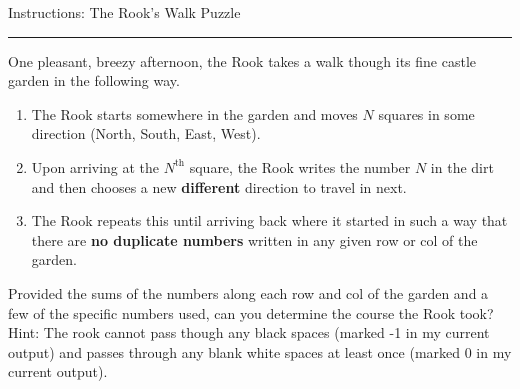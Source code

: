 \documentclass[english]{article}
\begin{document}
\begin{center}

{\huge Instructions: The Rook's Walk Puzzle}{\huge \par}

\end{center}\rule[0.5ex]{1\columnwidth}{1pt}

\noindent One pleasant, breezy afternoon, the Rook takes a walk though
its fine castle garden in the following way.
\begin{enumerate}
\item The Rook starts somewhere in the garden and moves $N$ squares in some direction (North, South, East, West).
\item Upon arriving at the $N^{\text{th}}$ square, the Rook writes the
number $N$ in the dirt and then chooses a new \textbf{different}
direction to travel in next.
\item The Rook repeats this until arriving back where it started in such a way that there are \textbf{no duplicate numbers} written in any given row or col of the garden. 
\end{enumerate}
Provided the sums of the numbers along each row and col of the garden and a few of the specific numbers used, can you determine the course the Rook took?  Hint: The rook cannot pass though any black spaces (marked -1 in my current output) and passes through any blank white spaces at least once (marked 0 in my current output).  

\end{document}
